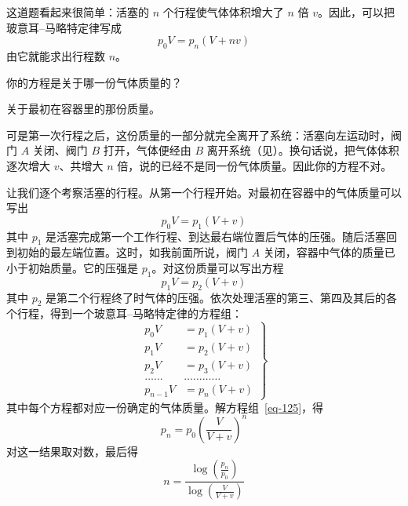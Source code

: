 \begin{dialogue}
\stda 这道题看起来很简单：活塞的 $n$ 个行程使气体体积增大了 $n$ 倍 $v$。因此，可以把玻意耳--马略特定律写成
\begin{equation*}%
p_{0}V = p_{n} (V + nv)
\end{equation*}
由它就能求出行程数 $n$。

\tchr 你的方程是关于哪一份气体质量的？

\stda 关于最初在容器里的那份质量。

\tchr 可是第一次行程之后，这份质量的一部分就完全离开了系统：活塞向左运动时，阀门 $A$ 关闭、阀门 $B$ 打开，气体便经由 $B$ 离开系统（见）。换句话说，把气体体积逐次增大 $v$、共增大 $n$ 倍，说的已经不是同一份气体质量。因此你的方程不对。

让我们逐个考察活塞的行程。从第一个行程开始。对最初在容器中的气体质量可以写出
\begin{equation*}%
p_{0}V = p_{1} (V + v)
\end{equation*}
其中 $p_{1}$ 是活塞完成第一个工作行程、到达最右端位置后气体的压强。随后活塞回到初始的最左端位置。这时，如我前面所说，阀门 $A$ 关闭，容器中气体的质量已小于初始质量。它的压强是 $p_{1}$。对这份质量可以写出方程
\begin{equation*}%
p_{1}V = p_{2} (V + v)
\end{equation*}
其中 $p_{2}$ 是第二个行程终了时气体的压强。依次处理活塞的第三、第四及其后的各个行程，得到一个玻意耳--马略特定律的方程组：
\begin{equation}%
\left.
\begin{aligned}
p_{0}V & = p_{1} (V + v)\\
p_{1}V &= p_{2} (V + v)\\
p_{2}V & = p_{3} (V + v)\\
\dots{}\ldots{} &\dots{}\ldots{}\dots{}\ldots{}  \\
p_{n-1}V & =p_{n} (V+v)
\label{eq-125}
\end{aligned}
\right\}
\end{equation}
其中每个方程都对应一份确定的气体质量。解方程组~\eqref{eq-125}，得
\begin{equation*}%
p_{n}= p_{0} \left( \dfrac{V}{V+v} \right)^{n}
\end{equation*}
对这一结果取对数，最后得
\begin{equation}%
n = \frac{\log \left(\frac{p_{n}}{p_{0}}\right)}{\log \left( \frac{V}{V+v} \right)}
\label{eq-126}
\end{equation}

\end{dialogue}

